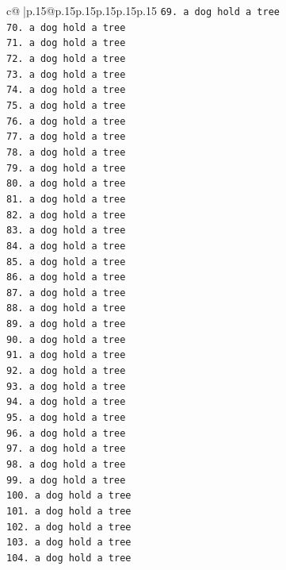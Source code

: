 \documentclass{article}
\begin{document}
{\begin{supertabular}{c@{$\;$}|p{.15\linewidth}@{}p{.15\linewidth}p{.15\linewidth}p{.15\linewidth}p{.15\linewidth}p{.15\linewidth}}
{{{\texttt{69. a dog hold a tree} \\
\texttt{70. a dog hold a tree} \\
\texttt{71. a dog hold a tree} \\
\texttt{72. a dog hold a tree} \\
\texttt{73. a dog hold a tree} \\
\texttt{74. a dog hold a tree} \\
\texttt{75. a dog hold a tree} \\
\texttt{76. a dog hold a tree} \\
\texttt{77. a dog hold a tree} \\
\texttt{78. a dog hold a tree} \\
\texttt{79. a dog hold a tree} \\
\texttt{80. a dog hold a tree} \\
\texttt{81. a dog hold a tree} \\
\texttt{82. a dog hold a tree} \\
\texttt{83. a dog hold a tree} \\
\texttt{84. a dog hold a tree} \\
\texttt{85. a dog hold a tree} \\
\texttt{86. a dog hold a tree} \\
\texttt{87. a dog hold a tree} \\
\texttt{88. a dog hold a tree} \\
\texttt{89. a dog hold a tree} \\
\texttt{90. a dog hold a tree} \\
\texttt{91. a dog hold a tree} \\
\texttt{92. a dog hold a tree} \\
\texttt{93. a dog hold a tree} \\
\texttt{94. a dog hold a tree} \\
\texttt{95. a dog hold a tree} \\
\texttt{96. a dog hold a tree} \\
\texttt{97. a dog hold a tree} \\
\texttt{98. a dog hold a tree} \\
\texttt{99. a dog hold a tree} \\
\texttt{100. a dog hold a tree} \\
\texttt{101. a dog hold a tree} \\
\texttt{102. a dog hold a tree} \\
\texttt{103. a dog hold a tree} \\
\texttt{104. a dog hold a tree} \\
}}}
\end{supertabular}}
\end{document}
